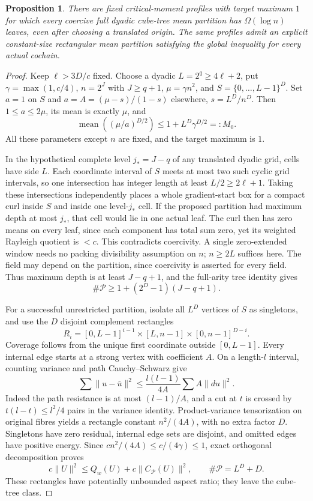 \documentclass[11pt]{article}
\newtheorem{proposition}[theorem]{Proposition}
\begin{document}
\begin{proposition}\label{ap:prop:dyadic}
There are fixed critical-moment profiles with target maximum $1$ for which every
coercive full dyadic cube-tree mean partition has $\Omega(\log n)$ leaves, even after
choosing a translated origin. The same profiles admit an explicit constant-size
rectangular mean partition satisfying the global inequality for every actual cochain.
\end{proposition}
\begin{proof}
Keep $\ell>3D/c$ fixed. Choose a dyadic $L=2^q\geq4\ell+2$, put
$\gamma=\max(1,c/4)$, $n=2^J$ with $J\geq q+1$, $\mu=\gamma n^2$, and
$S=\{0,\ldots,L-1\}^D$. Set $a=1$ on $S$ and $a=A=(\mu-s)/(1-s)$ elsewhere,
$s=L^D/n^D$. Then $1\leq a\leq2\mu$, its mean is exactly $\mu$, and
\[
 \operatorname{mean}((\mu/a)^{D/2})\leq1+L^D\gamma^{D/2}=:M_0.
\]
All these parameters except $n$ are fixed, and the target maximum is $1$.

In the hypothetical complete level $j_*=J-q$ of any translated dyadic grid, cells
have side $L$. Each coordinate interval of $S$ meets at most two such cyclic grid
intervals, so one intersection has integer length at least $L/2\geq2\ell+1$.
Taking these intersections independently places a whole gradient-start box for a
compact curl inside $S$ and inside one level-$j_*$ cell. If the proposed partition
had maximum depth at most $j_*$, that cell would lie in one actual leaf. The curl
then has zero means on every leaf, since each component has total sum zero, yet its
weighted Rayleigh quotient is $<c$. This contradicts coercivity. A single zero-extended
window needs no packing divisibility assumption on $n$; $n\geq2L$ suffices here.
The field may depend on the partition, since coercivity is asserted for every field.
Thus maximum depth is at least $J-q+1$, and the full-arity tree identity gives
\begin{equation}\label{ap:eq:dyadiclower}
 \#\mathcal P\geq1+(2^D-1)(J-q+1).
\end{equation}

For a successful unrestricted partition, isolate all $L^D$ vertices of $S$ as
singletons, and use the $D$ disjoint complement rectangles
\[
 R_i=[0,L-1]^{i-1}\times[L,n-1]\times[0,n-1]^{D-i}.
\]
Coverage follows from the unique first coordinate outside $[0,L-1]$.
Every internal edge starts at a strong vertex with coefficient $A$.
On a length-$l$ interval, counting variance and path Cauchy--Schwarz give
\[
 \sum\|u-\bar u\|^2\leq\frac{l(l-1)}{4A}\sum A\|du\|^2.
\]
Indeed the path resistance is at most $(l-1)/A$, and a cut at $t$ is crossed by
$t(l-t)\leq l^2/4$ pairs in the variance identity.
Product-variance tensorization on original fibres yields a rectangle constant
$n^2/(4A)$, with no extra factor $D$. Singletons have zero residual, internal edge
sets are disjoint, and omitted edges have positive energy. Since
$cn^2/(4A)\leq c/(4\gamma)\leq1$, exact orthogonal decomposition proves
\[
 c\|U\|^2\leq Q_w(U)+c\|C_{\mathcal P}(U)\|^2,
 \qquad \#\mathcal P=L^D+D.
\]
These rectangles have potentially unbounded aspect ratio; they leave the cube-tree class.
\end{proof}
\end{document}

